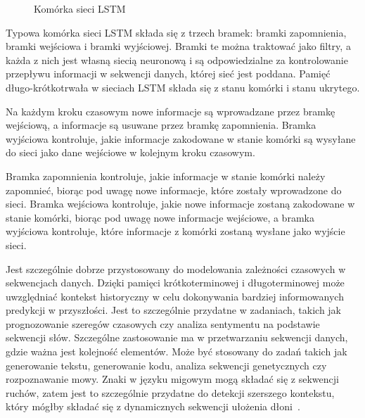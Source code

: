 \begin{figure}[H]
    \caption{Komórka sieci LSTM}
    \label{fig:lstm-cell}
\end{figure}

Typowa komórka sieci LSTM składa się z trzech bramek: bramki zapomnienia, bramki wejściowa i bramki wyjściowej. Bramki te można traktować jako filtry, a każda z nich jest własną siecią neuronową i są odpowiedzialne za kontrolowanie przepływu informacji w sekwencji danych, której sieć jest poddana. Pamięć długo-krótkotrwała w sieciach LSTM składa się z stanu komórki i stanu ukrytego.

Na każdym kroku czasowym nowe informacje są wprowadzane przez bramkę wejściową, a informacje są usuwane przez bramkę zapomnienia. Bramka wyjściowa kontroluje, jakie informacje zakodowane w stanie komórki są wysyłane do sieci jako dane wejściowe w kolejnym kroku czasowym.

Bramka zapomnienia kontroluje, jakie informacje w stanie komórki należy zapomnieć, biorąc pod uwagę nowe informacje, które zostały wprowadzone do sieci. Bramka wejściowa kontroluje, jakie nowe informacje zostaną zakodowane w stanie komórki, biorąc pod uwagę nowe informacje wejściowe, a bramka wyjściowa kontroluje, które informacje z komórki zostaną wysłane jako wyjście sieci.

Jest szczególnie dobrze przystosowany do modelowania zależności czasowych w sekwencjach danych. Dzięki pamięci krótkoterminowej i długoterminowej może uwzględniać kontekst historyczny w celu dokonywania bardziej informowanych predykcji w przyszłości. Jest to szczególnie przydatne w zadaniach, takich jak prognozowanie szeregów czasowych czy analiza sentymentu na podstawie sekwencji słów. Szczególne zastosowanie ma w przetwarzaniu sekwencji danych, gdzie ważna jest kolejność elementów. Może być stosowany do zadań takich jak generowanie tekstu, generowanie kodu, analiza sekwencji genetycznych czy rozpoznawanie mowy. Znaki w języku migowym mogą składać się z sekwencji ruchów, zatem jest to szczególnie przydatne do detekcji szerszego kontekstu, który mógłby składać się z dynamicznych sekwencji ułożenia dłoni~\cite{lee2021}.

